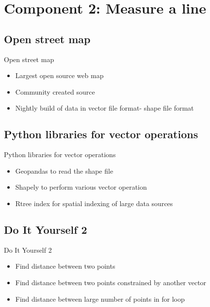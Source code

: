 \section[Component 2]{Component 2: Measure a line}
\subsection[Open street map]{Open street map}


\begin{frame}{Open street map}
	\begin{beamerboxesrounded}{}
		\begin{itemize}
			\item Largest open source web map
			\item Community created source
			\item Nightly build of data in vector file format- shape file format
		\end{itemize}
	\end{beamerboxesrounded}
\end{frame}


\subsection[Python libraries for vector operations]{Python libraries for vector operations}

\begin{frame}{Python libraries for vector operations}
\begin{beamerboxesrounded}{}
	\begin{itemize}
		\item Geopandas to read the shape file
		\item Shapely to perform various vector operation
		\item Rtree index for spatial indexing of large data sources
	\end{itemize}
\end{beamerboxesrounded}
\end{frame}

\subsection{Do It Yourself 2}


\begin{frame}{Do It Yourself 2}
\begin{beamerboxesrounded}{}
	\begin{itemize}
		\item Find distance between two points 
		\item Find distance between two points constrained by another vector \item Find distance between large number of points in for loop	
	\end{itemize}
\end{beamerboxesrounded}
\end{frame}